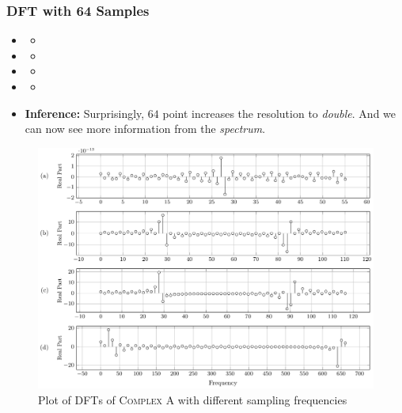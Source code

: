 \documentclass[../../course]{subfiles}
\begin{document}
\subsubsection{DFT with 64 Samples}

\begin{itemize} [label=]

    \item \sampFreqMuchLess
        \begin{itemize} [label=]
            \item
        \end{itemize}

    \item \sampFreqNorm
        \begin{itemize} [label=]
            \item
        \end{itemize}

    \item \sampFreqSligGreat
        \begin{itemize} [label=]
            \item
        \end{itemize}

    \item \sampFreqMuchGreat
        \begin{itemize} [label=]
            \item
        \end{itemize}

    \item \textbf{Inference:} Surprisingly, $64$ point increases the resolution to \emph{double}. And we
        can now see more information from the \emph{spectrum}.

\end{itemize}

\vfill

\begin{figure} [H]
    \centering
     {
        \includegraphics[height = 0.8\textheight] {tikzpics/plotDftComplexA64.pdf}
    }
     {Plot of \textsc{DFT}s of \textsc{Complex A} with different sampling frequencies}
    \label{plt:dftComplexA}
\end{figure}
\end{document}
